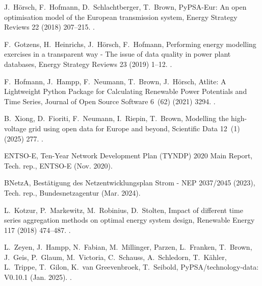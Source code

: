 \documentclass[preprint,12pt,sort&compress]{elsarticle}
\begin{document}
\begin{thebibliography}{10}
J.~H{\"o}rsch, F.~Hofmann, D.~Schlachtberger, T.~Brown, {{PyPSA-Eur}}: {{An}} open optimisation model of the {{European}} transmission system, Energy Strategy Reviews 22 (2018) 207--215.
\newblock \href {https://doi.org/10.1016/j.esr.2018.08.012} {}.

F.~Gotzens, H.~Heinrichs, J.~H{\"o}rsch, F.~Hofmann, Performing energy modelling exercises in a transparent way - {{The}} issue of data quality in power plant databases, Energy Strategy Reviews 23 (2019) 1--12.
\newblock \href {https://doi.org/10.1016/j.esr.2018.11.004} {}.

F.~Hofmann, J.~Hampp, F.~Neumann, T.~Brown, J.~H{\"o}rsch, Atlite: {{A Lightweight Python Package}} for {{Calculating Renewable Power Potentials}} and {{Time Series}}, Journal of Open Source Software 6~(62) (2021) 3294.
\newblock \href {https://doi.org/10.21105/joss.03294} {}.

B.~Xiong, D.~Fioriti, F.~Neumann, I.~Riepin, T.~Brown, Modelling the high-voltage grid using open data for {{Europe}} and beyond, Scientific Data 12~(1) (2025) 277.
\newblock \href {https://doi.org/10.1038/s41597-025-04550-7} {}.

{ENTSO-E}, Ten-{{Year Network Development Plan}} ({{TYNDP}}) 2020 {{Main Report}}, Tech. rep., ENTSO-E (Nov. 2020).

BNetzA, {Best{\"a}tigung des Netzentwicklungsplan Strom - NEP 2037/2045 (2023)}, Tech. rep., Bundesnetzagentur (Mar. 2024).

L.~Kotzur, P.~Markewitz, M.~Robinius, D.~Stolten, Impact of different time series aggregation methods on optimal energy system design, Renewable Energy 117 (2018) 474--487.
\newblock \href {https://doi.org/10.1016/j.renene.2017.10.017} {}.

L.~Zeyen, J.~Hampp, N.~Fabian, M.~Millinger, Parzen, L.~Franken, T.~Brown, J.~Geis, P.~Glaum, M.~Victoria, C.~Schauss, A.~Schledorn, T.~K{\"a}hler, L.~Trippe, T.~Gilon, K.~{van Greevenbroek}, T.~Seibold, {{PyPSA}}/technology-data: V0.10.1 (Jan. 2025).
\newblock \href {https://doi.org/10.5281/ZENODO.14621698} {}.


\end{thebibliography}
\end{document}
